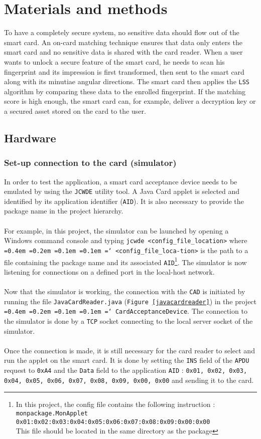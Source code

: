 \documentclass[a4paper,12pt]{article}
\newcommand*\justify{%
  \fontdimen2\font=0.4em%
  \fontdimen3\font=0.2em%
  \fontdimen4\font=0.1em%
  \fontdimen7\font=0.1em%
  \hyphenchar\font=`\-%
}
\begin{document}
\section{Materials and methods}
To have a completely secure system, no sensitive data should flow out of the smart card. An on-card matching technique ensures that data only enters the smart card and no sensitive data is shared with the card reader. When a user wants to unlock a secure feature of the smart card, he needs to scan his fingerprint and its impression is first transformed, then sent to the smart card along with its minutiae angular directions. The smart card then applies the \texttt{LSS} algorithm by comparing these data to the enrolled fingerprint. If the matching score is high enough, the smart card can, for example, deliver a decryption key or a secured asset stored on the card to the user.
\subsection{Hardware}




\subsubsection{Set-up connection to the card (simulator)}
In order to test the application, a smart card acceptance device needs to be emulated by using the \texttt{JCWDE} utility tool. A Java Card applet is selected and identified by its application identifier (\texttt{AID}). It is also necessary to provide the package name in the project hierarchy.
\\\\
For example, in this project, the simulator can be launched by opening a Windows command console and typing \texttt{jcwde <config\_file\_location>} where \texttt{\justify <config\_file\_loca-tion>} is the path to a file containing the package name and its associated \texttt{AID}\footnote{In this project, the config file contains the following instruction : \\ \texttt{monpackage.MonApplet 0x01:0x02:0x03:0x04:0x05:0x06:0x07:0x08:0x09:0x00:0x00} \\ This file should be located in the same directory as the package}. The simulator is now listening for connections on a defined port in the local-host network.
\\\\
Now that the simulator is working, the connection with the \texttt{CAD} is initiated by running the file \texttt{JavaCardReader.java} (\texttt{Figure \ref{javacardreader}}) in the project \texttt{\justify CardAcceptanceDevice}. The connection to the simulator is done by a \texttt{TCP} socket connecting to the local server socket of the simulator.
\\\\
Once the connection is made, it is still necessary for the card reader to select and run the applet on the smart card. It is done by setting the \texttt{INS} field of the \texttt{APDU} request to \texttt{0xA4} and the \texttt{Data} field to the application \texttt{AID} : \texttt{0x01, 0x02, 0x03, 0x04, 0x05, 0x06, 0x07, 0x08, 0x09, 0x00, 0x00} and sending it to the card.
\end{document}
